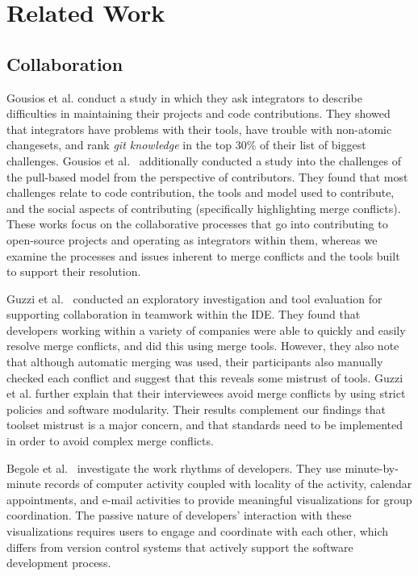 
\section{Related Work}\label{related_work}

\subsection{Collaboration}

Gousios et al. \cite{integrator_perspective} conduct a study in which they ask integrators to describe difficulties in maintaining their projects and code contributions. 
They showed that integrators have problems with their tools, have trouble with non-atomic changesets, and rank \textit{git knowledge} in the top 30\% of their list of biggest challenges. 
Gousios et al.~\cite{gousios2016work} additionally conducted a study into the challenges of the pull-based model from the perspective of contributors. 
They found that most challenges relate to code contribution, the tools and model used to contribute, and the social aspects of contributing (specifically highlighting merge conflicts).
These works focus on the collaborative processes that go into contributing to open-source projects and operating as integrators within them, whereas we examine the processes and issues inherent to merge conflicts and the tools built to support their resolution.

Guzzi et al.~\cite{Guzzi2015} conducted an exploratory investigation and tool evaluation for supporting collaboration in teamwork within the IDE.
They found that developers working within a variety of companies were able to quickly and easily resolve merge conflicts, and did this using merge tools.
However, they also note that although automatic merging was used, their participants also manually checked each conflict and suggest that this reveals some mistrust of tools.
Guzzi et al. further explain that their interviewees avoid merge conflicts by using strict policies and software modularity.
Their results complement our findings that toolset mistrust is a major concern, and that standards need to be implemented in order to avoid complex merge conflicts.

Begole et al.~\cite{begole_work_2002} investigate the work rhythms of developers.
They use minute-by-minute records of computer activity coupled with locality of the activity, calendar appointments, and e-mail activities to provide meaningful visualizations for group coordination.
The passive nature of developers' interaction with these visualizations requires users to engage and coordinate with each other, which differs from version control systems that actively support the software development process.

